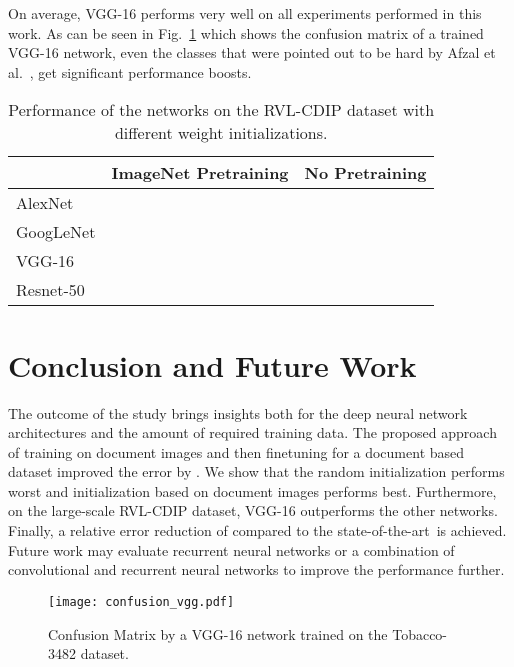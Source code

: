 \documentclass[conference]{IEEEtran}
\newcommand*{\sota}		{state-of-the-art\ }
\begin{document}
On average, VGG-16 performs very well on all experiments performed in this work. As can be seen in Fig.~\ref{fig:confusion} which shows the confusion matrix of a trained VGG-16 network, even the classes that were pointed out to be hard by Afzal et al.~\cite{afzal2015deepdocclassifier}, get significant performance boosts.


\begin{table}
\renewcommand{\arraystretch}{1.3}
\centering
\caption{Performance of the networks on the RVL-CDIP dataset with different weight initializations.}
\begin{tabular}{l|c|c}
 & ImageNet Pretraining & No Pretraining \\\hline
AlexNet &  &  \\\hline
GoogLeNet &  &  \\\hline
VGG-16 &  &  \\\hline
Resnet-50 &  & 
\end{tabular}
\label{tab:accuracy_large}
\end{table}


  
\section{Conclusion and Future Work}




The outcome of the study brings insights both for the deep neural network architectures and the amount of required training data. The proposed approach of training on document images and then finetuning for a document based dataset improved the error by .
We show that the random initialization performs worst and initialization based on document images performs best.
Furthermore, on the large-scale RVL-CDIP dataset, VGG-16 outperforms the other networks.
Finally, a relative error reduction of  compared to the \sota is achieved. 
Future work may evaluate recurrent neural networks or a combination of convolutional and recurrent neural networks to improve the performance further.







\begin{figure}
        \centering
        \texttt{[image: confusion\_vgg.pdf]}
        \caption{Confusion Matrix by a VGG-16 network trained on the Tobacco-3482 dataset.}
\label{fig:confusion}
\end{figure}
 
\ifCLASSOPTIONcaptionsoff
  \newpage
\fi




\end{document}

